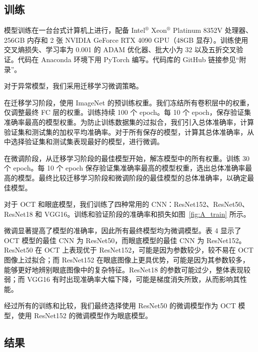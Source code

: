 \documentclass{article}
\begin{document}
	
	\begin{multicols}{2}
	\subsection{训练}
	\label{sec:a_training}
	
		模型训练在一台台式计算机上进行，配备 Intel$^®$ Xeon$^®$ Platinum 8352V 处理器、256GB 内存和 2 张 NVIDIA GeForce RTX 4090 GPU（48GB 显存）。训练使用交叉熵损失、学习率为 0.001 的 ADAM 优化器、批大小为 32 以及五折交叉验证。代码在 Anaconda 环境下用 PyTorch 编写。代码库的 GitHub 链接参见“附录”。
		
		\vspace{0.3cm}
		
		对于异常模型，我们采用迁移学习微调策略。
		
		在迁移学习阶段，使用 ImageNet \autocite{Krizhevsky_Sutskever_Hinton_2017}的预训练权重。我们冻结所有卷积层中的权重，仅调整最终 FC 层的权重。训练持续 100 个 epoch。每 10 个 epoch，保存验证集准确率最高的模型权重。为防止训练数据集的过拟合，我们引入总体准确率，计算验证集和测试集的加权平均准确率。对于所有保存的模型，计算其总体准确率，从中选择验证集和测试集表现最好的模型，进行微调。
		
		在微调阶段，从迁移学习阶段的最佳模型开始，解冻模型中的所有权重。训练 30 个 epoch。每 10 个 epoch 保存验证集准确率最高的模型权重，选出总体准确率最高的模型。最终比较迁移学习阶段和微调阶段的最佳模型的总体准确率，以确定最佳模型。
		
		对于 OCT 和眼底模型，我们训练了四种常用的 CNN：ResNet152、ResNet50、ResNet18 和 VGG16。训练和验证阶段的准确率和损失如图~\ref{fig:A_train} 所示。
		
		\vspace{0.3cm}
		
		微调显著提高了模型的准确率，因此所有最终模型均为微调模型。表 4 显示了 OCT 模型的最佳 CNN 为 ResNet50，而眼底模型的最佳 CNN 为 ResNet152。ResNet50 在 OCT 上表现优于 ResNet152，可能是因为参数较少，较不易在 OCT 图像上过拟合；而 ResNet152 在眼底图像上更具优势，可能是因为其参数较多，能够更好地辨别眼底图像中的复杂特征。ResNet18 的参数可能过少，整体表现较弱；而 VGG16 有时出现准确率大幅下降，可能是梯度消失所致，从而影响其性能。
		
		\vspace{0.2cm}
		
		经过所有的训练和比较，我们最终选择使用 ResNet50 的微调模型作为 OCT 模型，使用 ResNet152 的微调模型作为眼底模型。
		
		\subsection{结果}
		

\end{multicols}
\end{document}
